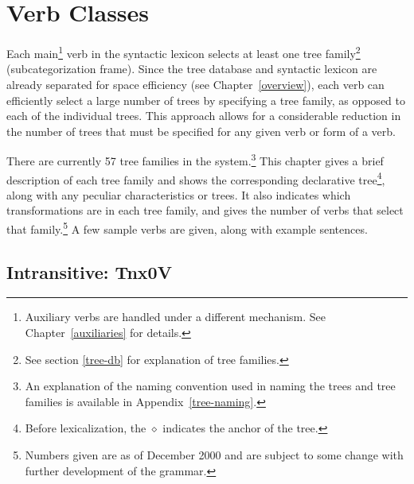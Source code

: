 
\chapter{Verb Classes}
\label{verb-classes}

Each main\footnote{Auxiliary verbs are handled under a different
mechanism.  See Chapter~\ref{auxiliaries} for details.} verb in the
syntactic lexicon selects at least one tree family\footnote{See
section \ref{tree-db} for explanation of tree families.}
(subcategorization frame).  Since the tree database and syntactic
lexicon are already separated for space efficiency (see
Chapter~\ref{overview}), each verb can efficiently select a large
number of trees by specifying a tree family, as opposed to each of the
individual trees.  This approach allows for a considerable reduction
in the number of trees that must be specified for any given verb or
form of a verb.

There are currently 57 tree families in the system.\footnote{An
  explanation of the naming convention used in naming the trees and
  tree families is available in Appendix~\ref{tree-naming}.}  This
chapter gives a brief description of each tree family and shows the
corresponding declarative tree\footnote{Before lexicalization, the
  $\diamond$ indicates the anchor of the tree.}, along with any
peculiar characteristics or trees.  It also indicates which
transformations are in each tree family, and gives the number of verbs
that select that family.\footnote{Numbers given are as of December 2000
  and are subject to some change with further development of the
  grammar.} A few sample verbs are given, along with example
sentences.


\section{Intransitive: Tnx0V}
\label{nx0V-family}


